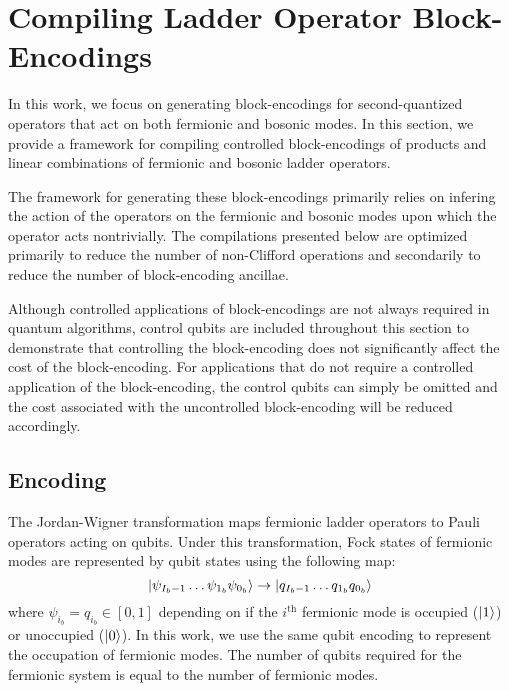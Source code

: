 \section{Compiling Ladder Operator Block-Encodings}
\label{sec:ladder-op-oracles}

In this work, we focus on generating block-encodings for second-quantized operators that act on both fermionic and bosonic modes.
In this section, we provide a framework for compiling controlled block-encodings of products and linear combinations of fermionic and bosonic ladder operators.

The framework for generating these block-encodings primarily relies on infering the action of the operators on the fermionic and bosonic modes upon which the operator acts nontrivially. 
The compilations presented below are optimized primarily to reduce the number of non-Clifford operations and secondarily to reduce the number of block-encoding ancillae.

Although controlled applications of block-encodings are not always required in quantum algorithms, control qubits are included throughout this section to demonstrate that controlling the block-encoding does not significantly affect the cost of the block-encoding.
For applications that do not require a controlled application of the block-encoding, the control qubits can simply be omitted and the cost associated with the uncontrolled block-encoding will be reduced accordingly.

\subsection{Encoding}
\label{subsec:encoding}

The Jordan-Wigner transformation \cite{jordan-wigner} maps fermionic ladder operators to Pauli operators acting on qubits.
Under this transformation, Fock states of fermionic modes are represented by qubit states using the following map:
\begin{equation}
    \ket{\psi_{{I_b - 1}} \dots \psi_{1_b} \psi_{0_b}} \rightarrow \ket{q_{{I_b - 1}} \dots q_{1_b} q_{0_b}}
\end{equation}
where $\psi_{i_b} = q_{i_b} \in [0, 1]$ depending on if the $i^\text{th}$ fermionic mode is occupied ($\ket{1}$) or unoccupied ($\ket{0}$).
In this work, we use the same qubit encoding to represent the occupation of fermionic modes.
The number of qubits required for the fermionic system is equal to the number of fermionic modes.

